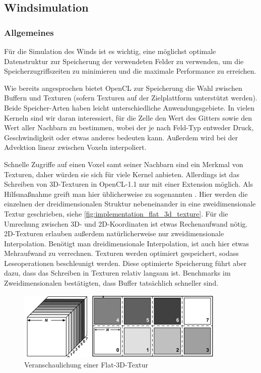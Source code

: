 \subsection{Windsimulation}

\subsubsection{Allgemeines}

Für die Simulation des Winds ist es wichtig, eine möglichst optimale
Datenstruktur zur Speicherung der verwendeten Felder zu verwenden, um
die Speicherzugriffszeiten zu minimieren und die maximale Performance zu
erreichen.

Wie bereits angesprochen bietet OpenCL zur Speicherung die Wahl zwischen Buffern
und Texturen (sofern Texturen auf der Zielplattform unterstützt werden). Beide
Speicher-Arten haben leicht unterschiedliche Anwendungsgebiete. In vielen
Kerneln sind wir daran interessiert, für die  Zelle den
Wert des Gitters sowie den Wert aller Nachbarn zu bestimmen, wobei der
 je nach Feld-Typ entweder Druck, Geschwindigkeit oder etwas
anderes bedeuten kann. Außerdem wird bei der Advektion linear zwischen Voxeln
interpoliert.

Schnelle Zugriffe auf einen Voxel samt seiner Nachbarn sind ein Merkmal von
Texturen, daher würden sie sich für viele Kernel anbieten. Allerdings ist das
Schreiben von 3D-Texturen in OpenCL-1.1 nur mit einer Extension möglich. Als
Hilfsmaßnahme greift man hier üblicherweise zu sogenannten
 \cite{Harris2003}. Hier werden die einzelnen
 der dreidimensionalen Struktur nebeneinander in eine
zweidimensionale Textur geschrieben, siehe
\autoref{fig:implementation_flat_3d_texture}. Für die Umrechung zwischen 3D- und
2D-Koordinaten ist etwas Rechenaufwand nötig. 2D-Texturen erlauben außerdem
natürlicherweise nur zweidimensionale Interpolation. Benötigt man
dreidimensionale Interpolation, ist auch hier etwas Mehraufwand zu verrechnen.
Texturen werden optimiert gespeichert, sodass Leseoperationen beschleunigt
werden. Diese optimierte Speicherung führt aber dazu, dass das Schreiben in
Texturen relativ langsam ist. Benchmarks im Zweidimensionalen bestätigten, dass
Buffer tatsächlich schneller sind.

\begin{figure}[ht]
\centering
\includegraphics[width=10cm]{images/flat_3d_texture}
\caption{Veranschaulichung einer Flat-3D-Textur}
\label{fig:implementation_flat_3d_texture}
\end{figure}

